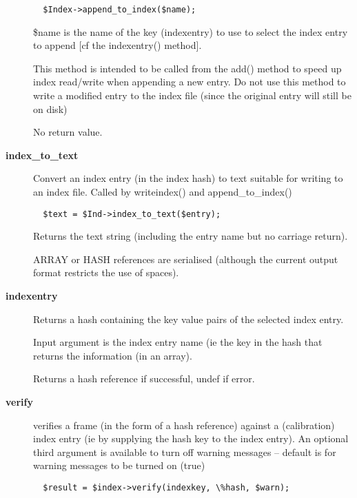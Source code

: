 \begin{description}
\begin{verbatim}
  $Index->append_to_index($name);
\end{verbatim}


\$name is the name of the key (indexentry) to use to select the
index entry to append [cf the indexentry() method].



This method is intended to be called from the add() method
to speed up index read/write when appending a new entry.
Do not use this method to write a modified entry to the
index file (since the original entry will still be on disk)



No return value.


\item[{\textbf{index\_to\_text}}] \mbox{}

Convert an index entry (in the index hash) to text suitable for
writing to an index file. Called by writeindex() and append\_to\_index()

\begin{verbatim}
  $text = $Ind->index_to_text($entry);
\end{verbatim}


Returns the text string (including the entry name but no carriage
return).



ARRAY or HASH references are serialised (although the current output
format restricts the use of spaces).


\item[{\textbf{indexentry}}] \mbox{}

Returns a hash containing the key value pairs of the
selected index entry.



Input argument is the index entry name (ie the key in the hash
that returns the information (in an array).



Returns a hash reference if successful, undef if error.


\item[{\textbf{verify}}] \mbox{}

verifies a frame (in the form of a hash reference) against a
(calibration) index entry (ie by supplying the hash key to the index
entry). An optional third argument is available to turn off warning
messages -- default is for warning messages to be turned on (true)

\begin{verbatim}
  $result = $index->verify(indexkey, \%hash, $warn);
\end{verbatim}



\end{description}
